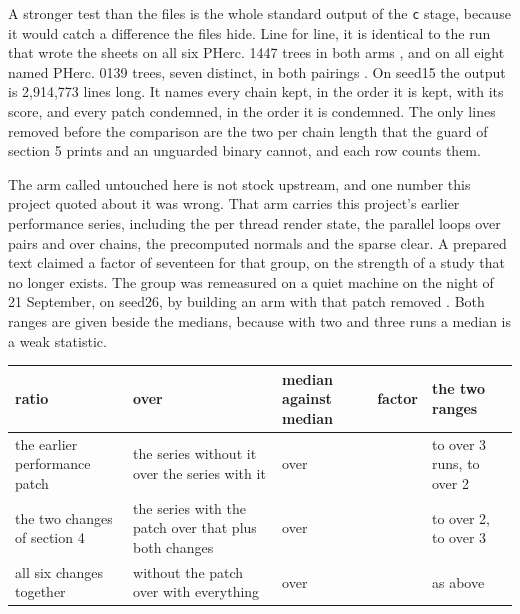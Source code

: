 A stronger test than the files is the whole standard output of the \texttt{c} stage, because it would catch a difference the files hide. Line for line, it is identical to the run that wrote the sheets on all six PHerc. 1447 trees in both arms {}, and on all eight named PHerc. 0139 trees, seven distinct, in both pairings {}. On seed15 the output is 2,914,773 lines long. It names every chain kept, in the order it is kept, with its score, and every patch condemned, in the order it is condemned. The only lines removed before the comparison are the two per chain length that the guard of section 5 prints and an unguarded binary cannot, and each row counts them.

The arm called untouched here is not stock upstream, and one number this project quoted about it was wrong. That arm carries this project's earlier performance series, including the per thread render state, the parallel loops over pairs and over chains, the precomputed normals and the sparse clear. A prepared text claimed a factor of seventeen for that group, on the strength of a study that no longer exists. The group was remeasured on a quiet machine on the night of 21 September, on seed26, by building an arm with that patch removed {}. Both ranges are given beside the medians, because with two and three runs a median is a weak statistic.

\begin{table}[t]
\centering
\small
\begin{tabularx}{\textwidth}{XXXXX}
\toprule
ratio & over & median against median & factor & the two ranges \\
\midrule
the earlier performance patch & the series without it over the series with it & \BenchNoAEightSeedTwentySixMedian{} over \BenchPlainSeedTwentySixMedian{} & \EarlierPatchFactorMedian{} & \BenchNoAEightSeedTwentySixMin{} to \BenchNoAEightSeedTwentySixMax{} over 3 runs, \BenchPlainSeedTwentySixMin{} to \BenchPlainSeedTwentySixMax{} over 2 \\
the two changes of section 4 & the series with the patch over that plus both changes & \BenchPlainSeedTwentySixMedian{} over \BenchBothSeedTwentySixMedian{} & \BothChangesFactor{} & \BenchPlainSeedTwentySixMin{} to \BenchPlainSeedTwentySixMax{} over 2, \BenchBothSeedTwentySixMin{} to \BenchBothSeedTwentySixMax{} over 3 \\
all six changes together & without the patch over with everything & \BenchNoAEightSeedTwentySixMedian{} over \BenchBothSeedTwentySixMedian{} & \AllSixFactor{} & as above \\
\bottomrule
\end{tabularx}
\end{table}

